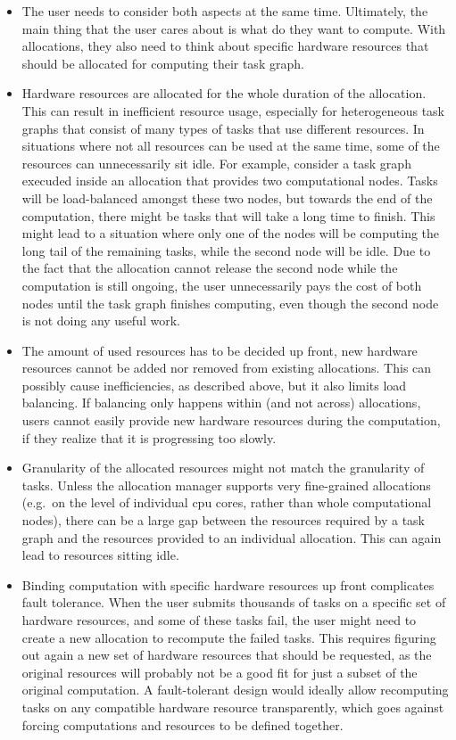\begin{itemize}
	\item The user needs to consider both aspects at the same time. Ultimately, the main thing that the user
	      cares about is what do they want to compute. With allocations, they also need to think about
	      specific hardware resources that should be allocated for computing their task graph.
	\item Hardware resources are allocated for the whole duration of the allocation. This can result in
	      inefficient resource usage, especially for heterogeneous task graphs that consist of many types of
	      tasks that use different resources. In situations where not all resources can be used at the same
	      time, some of the resources can unnecessarily sit idle. For example, consider a task graph execuded
	      inside an allocation that provides two computational nodes. Tasks will be load-balanced amongst
	      these two nodes, but towards the end of the computation, there might be tasks that will take a long
	      time to finish. This might lead to a situation where only one of the nodes will be computing the
	      long tail of the remaining tasks, while the second node will be idle. Due to the fact that the
	      allocation cannot release the second node while the computation is still ongoing, the user
	      unnecessarily pays the cost of both nodes until the task graph finishes computing, even though the
	      second node is not doing any useful work.

	\item The amount of used resources has to be decided up front, new hardware resources cannot be added nor
	      removed from existing allocations. This can possibly cause inefficiencies, as described above, but
	      it also limits load balancing. If balancing only happens within (and not across) allocations, users
	      cannot easily provide new hardware resources during the computation, if they realize that it is
	      progressing too slowly.
	\item Granularity of the allocated resources might not match the granularity of tasks. Unless the
	      allocation manager supports very fine-grained allocations (e.g.\ on the level of individual
	      \gls{cpu} cores, rather than whole computational nodes), there can be a large gap
	      between the resources required by a task graph and the resources provided to an individual
	      allocation. This can again lead to resources sitting idle.
	\item Binding computation with specific hardware resources up front complicates fault tolerance. When the
	      user submits thousands of tasks on a specific set of hardware resources, and some of these tasks
	      fail, the user might need to create a new allocation to recompute the failed tasks. This requires
	      figuring out again a new set of hardware resources that should be requested, as the original
	      resources will probably not be a good fit for just a subset of the original computation. A
	      fault-tolerant design would ideally allow recomputing tasks on any compatible hardware resource
	      transparently, which goes against forcing computations and resources to be defined together.
\end{itemize}

